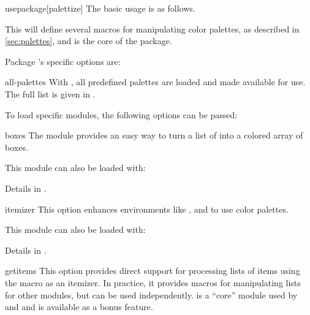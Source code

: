 \documentclass[a4paper, 11pt]{article}
\begin{document}
\begin{macro*}{usepackage}{}[palettize]
    The basic usage is as follows.

    \begin{latexcode}
        \usepackage{palettize}
    \end{latexcode}

    This will define several macros for manipulating color palettes, as described in \cref{sec:palettes}, and is the core of the package.

    \bigskip
    Package 's specific options are:

    \begin{option}{all-palettes}{}
        With , all predefined palettes are loaded and made available for use. The full list is given in .
    \end{option}

    \bigskip
    To load specific modules, the following options can be passed:

    \begin{option}{boxes}{}
        The  module provides an easy way to turn a list of  into a colored array of boxes.

        This module can also be loaded with:
        \begin{latexcode}
            \usepackage{palettize-boxes}
        \end{latexcode}

        Details in .
    \end{option}

    \begin{option}{itemizer}{}
        This option enhances environments like ,  and  to use color palettes.

        This module can also be loaded with:
        \begin{latexcode}
            \usepackage{palettize-itemizer}
        \end{latexcode}

        Details in .
    \end{option}

    \begin{option}{getitems}{}
        This option provides direct support for processing lists of items using the \latexinline{\item} macro as an itemizer. In practice, it provides macros for manipulating lists for other  modules, but can be used independently.  is a ``core'' module used by  and  and is available as a bonus feature.


\end{option}
\end{macro*}
\end{document}

